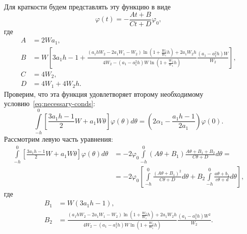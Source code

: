 \documentclass[a4paper,14pt]{article}
\begin{document}
Для краткости будем представлять эту функцию в виде
\begin{equation*}
  \varphi(t) = - \frac{A t + B}{C t + D} \varphi_0,
\end{equation*}
где
\begin{equation*}
  \begin{aligned}
    A
    &=
      2 W a_1, \\
    B
    &=
      W
      \left[
      3 a_1 h - 1
      +
      \frac{
      \left(a_1 h W_2 - 2 a_1 W_1 - W_2 \right)
      \ln \left( 1 +  \frac{W_2}{W_1} h \right)
      + 2 a_1 W_2 h
      }{4 W_2 - (a_1 - a_1^2 h) W
      \ln \left( 1 + \frac{W_2}{W_1} h \right)
      }
      \frac{(a_1 - a_1^2 h) W}{W_2}
      \right], \\
    C
    &=
      4 W_2, \\
    D
    &=
      4 W_1 + 4 W_2 h.
  \end{aligned}
\end{equation*}
Проверим, что эта функция удовлетворяет второму необходимому
условию~\eqref{eq:necessary-conds}:
\begin{equation*}
    \int\limits_{-h}^{0}
    \left[
      \frac{3 a_1 h - 1}{2}
      W
      +
      a_1 W \theta
    \right] \varphi(\theta) d\theta
    =
    \left(
      2 \alpha_1
      -
      \frac{a_1 h - 1}{2 a_1}
    \right)
    \varphi(0).
\end{equation*}
Рассмотрим левую часть уравнения:
\begin{equation*}
  \begin{aligned}
    \int\limits_{-h}^{0}
    \left[
    \frac{3 a_1 h - 1}{2}
    W
    +
    a_1 W \theta
    \right] \varphi(\theta) d\theta
    &=
      - 2 \varphi_0
      \int\limits_{-h}^{0} \left(
      A \theta + B_1
      \right) \frac{A \theta + B_1 + B_2}{C \theta + D} d\theta = \\
    &=
      - 2 \varphi_0
      \left[
      \int\limits_{-h}^{0}
      \frac{{(A \theta + B_1)}^2}{C \theta + D} d\theta
      +
      B_2
      \int\limits_{-h}^{0}
      \frac{a \theta + b_1}{c \theta + d} d\theta
      \right],
  \end{aligned}
\end{equation*}
где
\begin{equation*}
  \begin{aligned}
    B_1 &= W (3 a_1 h - 1), \\
    B_2 &=
      \frac{
      \left(a_1 h W_2 - 2 a_1 W_1 - W_2 \right)
      \ln \left( 1 +  \frac{W_2}{W_1} h \right)
      + 2 a_1 W_2 h
      }{4 W_2 - (a_1 - a_1^2 h) W
      \ln \left( 1 + \frac{W_2}{W_1} h \right)
      }
      \frac{(a_1 - a_1^2 h) W^2}{W_2}.
  \end{aligned}
\end{equation*}
\end{document}
